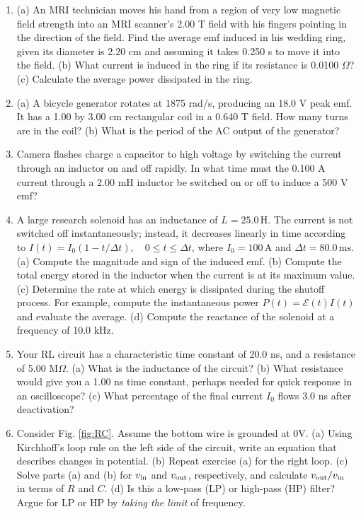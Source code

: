 \documentclass[12pt,twocolumn]{article}
\begin{document}
\begin{enumerate}
\item (a) An MRI technician moves his hand from a region of very low magnetic field strength into an MRI scanner's 2.00 T field with his fingers pointing in the direction of the field. Find the average emf induced in his wedding ring, given its diameter is 2.20 cm and assuming it takes 0.250 s to move it into the field. (b) What current is induced in the ring if its resistance is 0.0100 $\Omega$?  (c) Calculate the average power dissipated in the ring.
\item (a) A bicycle generator rotates at 1875 rad/s, producing an 18.0 V peak emf. It has a 1.00 by 3.00 cm rectangular coil in a 0.640 T field. How many turns are in the coil? (b) What is the period of the AC output of the generator?
\item Camera flashes charge a capacitor to high voltage by switching the current through an inductor on and off rapidly. In what time must the 0.100 A current through a 2.00 mH inductor be switched on or off to induce a 500 V emf?
\item A large research solenoid has an inductance of \(L = 25.0\,\text{H}\). The current is not switched off instantaneously; instead, it decreases linearly in time according to $I(t) = I_0\left(1 - t/\Delta t\right), \quad 0 \le t \le \Delta t$, where \(I_0 = 100\,\text{A}\) and \(\Delta t = 80.0\,\text{ms}\). (a) Compute the magnitude and sign of the induced emf. (b) Compute the total energy stored in the inductor when the current is at its maximum value. (c) Determine the rate at which energy is dissipated during the shutoff process.  For example, compute the instantaneous power $P(t) = \mathcal{E}(t)I(t)$ and evaluate the average.  (d) Compute the reactance of the solenoid at a frequency of 10.0 kHz.
\item Your RL circuit has a characteristic time constant of 20.0 ns, and a resistance of 5.00 M$\Omega$. (a) What is the inductance of the circuit? (b) What resistance would give you a 1.00 ns time constant, perhaps needed for quick response in an oscilloscope? (c) What percentage of the final current $I_0$ flows 3.0 ns after deactivation?
\item Consider Fig. \ref{fig:RC}.  Assume the bottom wire is grounded at 0V.  (a) Using Kirchhoff's loop rule on the left side of the circuit, write an equation that describes changes in potential.  (b) Repeat exercise (a) for the right loop.  (c) Solve parts (a) and (b) for $v_{\rm in}$ and $v_{\rm out}$, respectively, and calculate $v_{\rm out}/v_{\rm in}$ in terms of $R$ and $C$. (d) Is this a low-pass (LP) or high-pass (HP) filter?  Argue for LP or HP by \textit{taking the limit} of frequency.

\end{enumerate}
\end{document}
